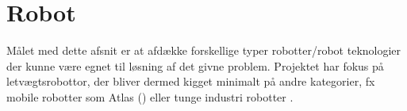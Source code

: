\section{Robot}
Målet med dette afsnit er at afdække forskellige typer robotter/robot teknologier der kunne være egnet til løsning af det givne problem. Projektet har fokus på letvægtsrobottor, der bliver dermed kigget minimalt på andre kategorier, fx mobile robotter som Atlas (\cite{2024AtlasDynamics}) eller tunge industri robotter \parencite{ABB2024ABB7710}.